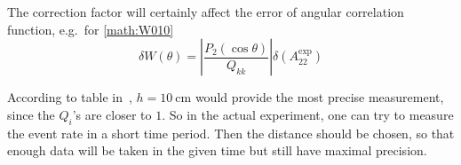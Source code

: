 The correction factor will certainly affect the error of angular correlation function, e.g.~for \eqref{math:W010}
\begin{equation}
   \delta W(\theta) = \left| \frac{P_2 (\cos\theta)}{Q_{kk}} \right| \delta (A_{22}^\text{exp})
\end{equation}

According to table in~\cite{siegbahn}, $h=\SI{10}{\cm}$ would provide the most precise measurement, since the $Q_i$'s are closer to $1$. So in the actual experiment, one can try to measure the event rate in a short time period. Then the distance should be chosen, so that enough data will be taken in the given time but still have maximal precision.
